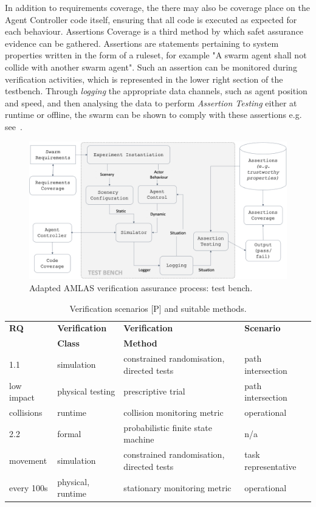 \documentclass[lettersize,journal]{IEEEtran}
\begin{document}
In addition to requirements coverage, the there may also be coverage place on the Agent Controller code itself, ensuring that all code is executed as expected for each behaviour. Assertions Coverage is a third method by which safet assurance evidence can be gathered. Assertions are statements pertaining to system properties written in the form of a ruleset, for example "A swarm agent shall not collide with another swarm agent". Such an assertion can be monitored during verification activities, which is represented in the lower right section of the testbench. Through \emph{logging} the appropriate data channels, such as agent position and speed, and then analysing the data to perform \emph{Assertion Testing} either at runtime or offline, the swarm can be shown to comply with these assertions e.g. see~\cite{harper2021safety}. 

\begin{figure}
	\centering
	\includegraphics[width=1.0\textwidth]{figures/verification-testbench.png}
	\caption{Adapted AMLAS verification assurance process: test bench.}
	\label{amlas-a-testbench}
\end{figure}


\begin{table}[t]
\caption{Verification scenarios [P] and suitable methods.}\label{tab:testgen}
\centering
\begin{tabular}{llll}
\textbf{RQ}   & \textbf{Verification}  & \textbf{Verification} & \textbf{Scenario} \\ 
              & \textbf{Class}         & \textbf{Method}		  & 		          \\ 
\hline
1.1 	      & simulation 	   & constrained randomisation, directed tests & path intersection     \\
low impact    & physical testing   & prescriptive trial 				       & path intersection	 \\
collisions    & runtime		   & collision monitoring metric 		       & operational		 \\
\hline
2.2 	      & formal 	 	   & probabilistic finite state machine 	   & n/a      \\
movement      & simulation 	   & constrained randomisation, directed tests & task representative     \\
every 100s    & physical, runtime  & stationary monitoring metric 			   & operational		 \\
\hline
\end{tabular}
\end{table}
\end{document}
